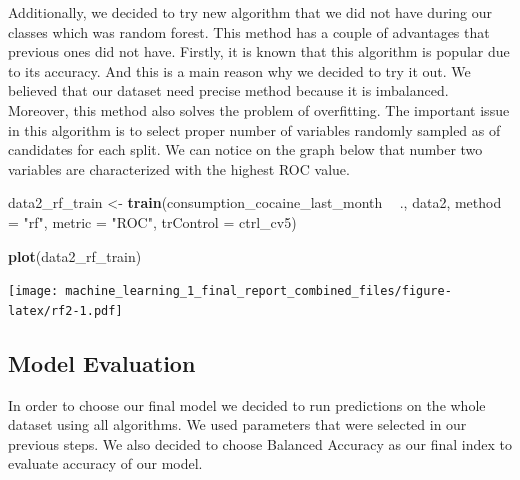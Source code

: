 \documentclass[
]{article}
\newenvironment{Shaded}{\begin{snugshade}}{\end{snugshade}}
\newcommand{\DataTypeTok}[1]{\textcolor[rgb]{0.13,0.29,0.53}{#1}}
\newcommand{\KeywordTok}[1]{\textcolor[rgb]{0.13,0.29,0.53}{\textbf{#1}}}
\newcommand{\NormalTok}[1]{#1}
\newcommand{\OperatorTok}[1]{\textcolor[rgb]{0.81,0.36,0.00}{\textbf{#1}}}
\newcommand{\StringTok}[1]{\textcolor[rgb]{0.31,0.60,0.02}{#1}}
\begin{document}
Additionally, we decided to try new algorithm that we did not have
during our classes which was random forest. This method has a couple of
advantages that previous ones did not have. Firstly, it is known that
this algorithm is popular due to its accuracy. And this is a main reason
why we decided to try it out. We believed that our dataset need precise
method because it is imbalanced. Moreover, this method also solves the
problem of overfitting. The important issue in this algorithm is to
select proper number of variables randomly sampled as of candidates for
each split. We can notice on the graph below that number two variables
are characterized with the highest ROC value.

\begin{Shaded}
\begin{Highlighting}[]
\NormalTok{data2_rf_train <-}\StringTok{ }
\StringTok{  }\KeywordTok{train}\NormalTok{(consumption_cocaine_last_month }\OperatorTok{~}\StringTok{ }\NormalTok{.,}
\NormalTok{        data2,        }
        \DataTypeTok{method =} \StringTok{"rf"}\NormalTok{,}
        \DataTypeTok{metric =} \StringTok{"ROC"}\NormalTok{,}
        \DataTypeTok{trControl =}\NormalTok{ ctrl_cv5)}

\KeywordTok{plot}\NormalTok{(data2_rf_train)}
\end{Highlighting}
\end{Shaded}

\texttt{[image: machine\_learning\_1\_final\_report\_combined\_files/figure-latex/rf2-1.pdf]}

\hypertarget{model-evaluation}{%
\subsection{Model Evaluation}\label{model-evaluation}}

In order to choose our final model we decided to run predictions on the
whole dataset using all algorithms. We used parameters that were
selected in our previous steps. We also decided to choose Balanced
Accuracy as our final index to evaluate accuracy of our model.
\end{document}
